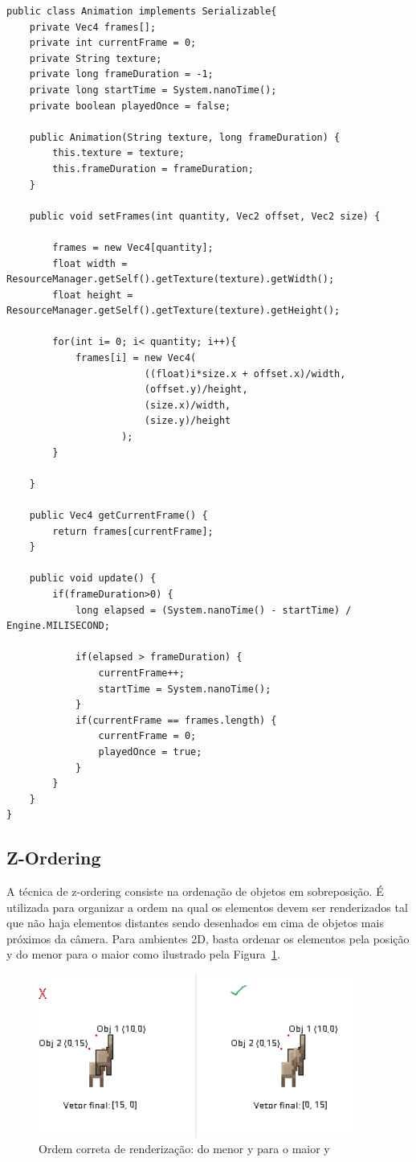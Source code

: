 \documentclass[12pt, 
openright, 
oneside, 
a4paper,    
brazil]{facom-ufu-abntex2}
\begin{document}
\begin{lstlisting}[caption=Classe Animation, label={alg:AnimationClass}]
public class Animation implements Serializable{
	private Vec4 frames[];
	private int currentFrame = 0;
	private String texture;
	private long frameDuration = -1;
	private long startTime = System.nanoTime();
	private boolean playedOnce = false;
	
	public Animation(String texture, long frameDuration) {
		this.texture = texture;
		this.frameDuration = frameDuration;
	}

	public void setFrames(int quantity, Vec2 offset, Vec2 size) {
	
		frames = new Vec4[quantity];
		float width = ResourceManager.getSelf().getTexture(texture).getWidth();
		float height = ResourceManager.getSelf().getTexture(texture).getHeight();
		
		for(int i= 0; i< quantity; i++){
			frames[i] = new Vec4(
						((float)i*size.x + offset.x)/width,
						(offset.y)/height,
						(size.x)/width,
						(size.y)/height
					);
		}
		
	}
	
	public Vec4 getCurrentFrame() {
		return frames[currentFrame];
	}
	
	public void update() {
		if(frameDuration>0) {
			long elapsed = (System.nanoTime() - startTime) / Engine.MILISECOND;
			
			if(elapsed > frameDuration) {
				currentFrame++;
				startTime = System.nanoTime();
			}
			if(currentFrame == frames.length) {
				currentFrame = 0;
				playedOnce = true;
			}
		}
	}
}
\end{lstlisting}
\subsection{Z-Ordering}
A técnica de z-ordering consiste na ordenação de objetos em sobreposição. É utilizada para organizar a ordem na qual os elementos devem ser renderizados tal que não haja elementos distantes sendo desenhados em cima de objetos mais próximos da câmera.
Para ambientes 2D, basta ordenar os elementos pela posição y do menor para o maior como ilustrado pela Figura~\ref{fig:zOrder}.

\begin{figure}[H]
	\centering
	\includegraphics[width=28em]{imagens/z-order.png}
	\caption{Ordem correta de renderização: do menor y para o maior y}
	\label{fig:zOrder}
\end{figure}
\end{document}
